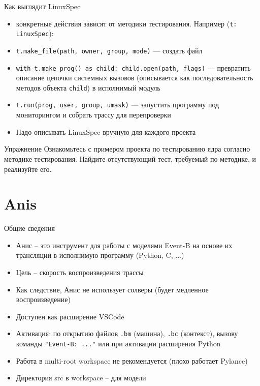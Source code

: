 \documentclass[hyperref={unicode=true}]{beamer}
\begin{document}
    \begin{frame}{Как выглядит LinuxSpec}
    \begin{itemize}
    \item конкретные действия зависят от методики тестирования. Например (\texttt{t: LinuxSpec}):
    \item \texttt{t.make\_file(path, owner, group, mode)} --- создать файл
    \item \texttt{with t.make\_prog() as child: child.open(path, flags)}
        --- превратить описание цепочки системных вызовов (описывается
                как последовательность методов объекта \texttt{child})
            в исполнимый модуль
    \item \texttt{t.run(prog, user, group, umask)} --- запустить программу
        под мониторингом и собрать трассу для перепроверки
    \item Надо описывать LinuxSpec вручную для каждого проекта 
    \end{itemize}
    \end{frame}

    \begin{frame}{Упражнение}
    Ознакомьтесь с примером проекта по тестированию ядра
    согласно методике тестирования. Найдите отсутствующий тест,
    требуемый по методике, и реализуйте его.
    \end{frame}

    \section{Anis}

    \begin{frame}{Общие сведения}
    \begin{itemize}
    \item Анис -- это инструмент для работы с моделями Event-B
	    на основе их трансляции в исполнимую программу (Python, C, ...)
    \item Цель -- скорость воспроизведения трассы
    \item Как следствие, Анис не использует солверы (будет медленное воспроизведение)
    \item Доступен как расширение VSCode
    \item Активация: по открытию файлов \texttt{.bm} (машина),
	    \texttt{.bc} (контекст), вызову команды \texttt{"Event-B: ..."}
		или при активации расширения Python
    \item Работа в multi-root workspace не рекомендуется (плохо работает Pylance)
    \item Директория src в workspace -- для модели
    \end{itemize}
    \end{frame}
\end{document}
